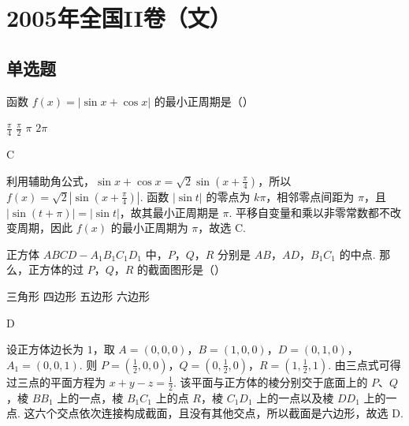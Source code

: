 \chapter{2005年全国II卷（文）}

\section{单选题}

\begin{problem}
函数 \( f(x) = |\sin x + \cos x| \) 的最小正周期是（\quad）

\choices
    {\(\frac{\pi}{4}\)}
    {\(\frac{\pi}{2}\)}
    {\(\pi\)}
    {\(2\pi\)}
\end{problem}

\begin{answer}C\end{answer}

\begin{solution}
利用辅助角公式，\(\sin x+\cos x=\sqrt{2}\sin\left(x+\frac{\pi}{4}\right)\)，所以 \(f(x)=\sqrt{2}\left|\sin\left(x+\frac{\pi}{4}\right)\right|\). 函数 \(|\sin t|\) 的零点为 \(k\pi\)，相邻零点间距为 \(\pi\)，且 \(|\sin(t+\pi)|=|\sin t|\)，故其最小正周期是 \(\pi\). 平移自变量和乘以非零常数都不改变周期，因此 \(f(x)\) 的最小正周期为 \(\pi\)，故选 C.
\end{solution}

\begin{problem}
正方体 \(ABCD-A_{1}B_{1}C_{1}D_{1}\) 中，\(P\)，\(Q\)，\(R\) 分别是 \(AB\)，\(AD\)，\(B_{1}C_{1}\) 的中点. 那么，正方体的过 \(P\)，\(Q\)，\(R\) 的截面图形是（\quad）

\choices
    {三角形}
    {四边形}
    {五边形}
    {六边形}
\end{problem}

\begin{answer}D\end{answer}

\begin{solution}
设正方体边长为 \(1\)，取 \(A=(0,0,0)\)，\(B=(1,0,0)\)，\(D=(0,1,0)\)，\(A_{1}=(0,0,1)\). 则 \(P=\left(\frac{1}{2},0,0\right)\)，\(Q=\left(0,\frac{1}{2},0\right)\)，\(R=\left(1,\frac{1}{2},1\right)\). 由三点式可得过三点的平面方程为 \(x+y-z=\frac{1}{2}\). 该平面与正方体的棱分别交于底面上的 \(P\)、\(Q\)，棱 \(BB_{1}\) 上的一点，棱 \(B_{1}C_{1}\) 上的点 \(R\)，棱 \(C_{1}D_{1}\) 上的一点以及棱 \(DD_{1}\) 上的一点. 这六个交点依次连接构成截面，且没有其他交点，所以截面是六边形，故选 D.
\end{solution}

